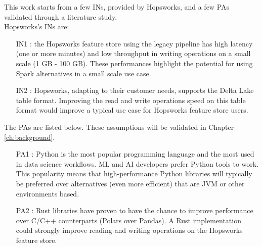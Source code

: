 This work starts from a few \glspl{IN}, provided by Hopsworks, and a few \glspl{PA} validated through a literature study. \\ Hopsworks's \glspl{IN} are:
\begin{itemize}
    \item[IN1 :] the Hopsworks feature store using the legacy pipeline has high latency (one or more minutes) and low throughput in writing operations on a small scale (1 GB - 100 GB). These performances highlight the potential for using Spark alternatives in a small scale use case.
    \item[IN2 :] Hopsworks, adapting to their customer needs, supports the Delta Lake table format. Improving the read and write operations speed on this table format would improve a typical use case for Hopsworks feature store users.
\end{itemize}
The \glspl{PA} are listed below. These assumptions will be validated in Chapter \ref{ch:background}. 
\begin{itemize}
    \item[PA1 :] Python is the most popular programming language and the most used in data science workflows. \gls{ML} and \gls{AI} developers prefer Python tools to work. This popularity means that high-performance Python libraries will typically be preferred over alternatives (even more efficient) that are \gls{JVM} or other environments based.
    \item[PA2 :] Rust libraries have proven to have the chance to improve performance over C/C++ counterparts (Polars over Pandas). A Rust implementation could strongly improve reading and writing operations on the Hopsworks feature store.
\end{itemize}

